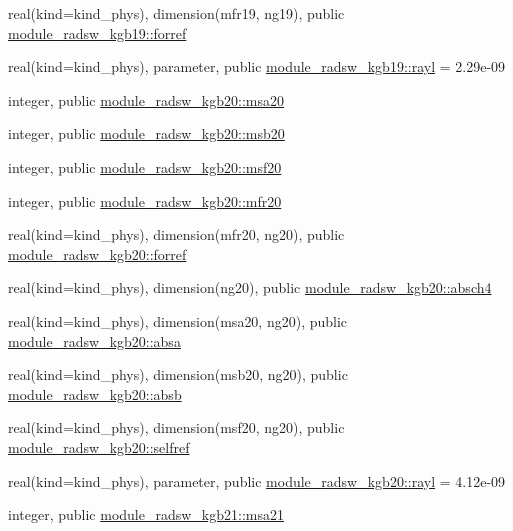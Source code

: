 \begin{DoxyCompactItemize}
\item 
real(kind=kind\+\_\+phys), dimension(mfr19, ng19), public \hyperlink{group__module__radsw__main_gabb4c30ad8e82694b33df78bb2687df6d}{module\+\_\+radsw\+\_\+kgb19\+::forref}
\item 
real(kind=kind\+\_\+phys), parameter, public \hyperlink{group__module__radsw__main_gac79ad61e8d246d6075664df4201373d7}{module\+\_\+radsw\+\_\+kgb19\+::rayl} = 2.\+29e-\/09
\item 
integer, public \hyperlink{namespacemodule__radsw__kgb20_aadf199a3d453192a891b575d9adf8608}{module\+\_\+radsw\+\_\+kgb20\+::msa20}
\item 
integer, public \hyperlink{group__module__radsw__main_ga385f5b8c61ed1de7aa3bbb6bd65f522f}{module\+\_\+radsw\+\_\+kgb20\+::msb20}
\item 
integer, public \hyperlink{group__module__radsw__main_ga925dc2da02eef4edcf000a14525a7c7e}{module\+\_\+radsw\+\_\+kgb20\+::msf20}
\item 
integer, public \hyperlink{group__module__radsw__main_ga9c7964eeb3acb4a11757fce977b73022}{module\+\_\+radsw\+\_\+kgb20\+::mfr20}
\item 
real(kind=kind\+\_\+phys), dimension(mfr20, ng20), public \hyperlink{group__module__radsw__main_ga3a660a7564064ca9997af9f95a5293b9}{module\+\_\+radsw\+\_\+kgb20\+::forref}
\item 
real(kind=kind\+\_\+phys), dimension(ng20), public \hyperlink{group__module__radsw__main_ga1757aee0ec8211f84e2c9334cc9b0f9d}{module\+\_\+radsw\+\_\+kgb20\+::absch4}
\item 
real(kind=kind\+\_\+phys), dimension(msa20, ng20), public \hyperlink{group__module__radsw__main_ga405eabf194b1216dd083c2344e80f5b4}{module\+\_\+radsw\+\_\+kgb20\+::absa}
\item 
real(kind=kind\+\_\+phys), dimension(msb20, ng20), public \hyperlink{group__module__radsw__main_gaf5b135f82f34831e86a12f726cbe47ad}{module\+\_\+radsw\+\_\+kgb20\+::absb}
\item 
real(kind=kind\+\_\+phys), dimension(msf20, ng20), public \hyperlink{group__module__radsw__main_gaa3853af5e29277f9ed2bdd397cab5029}{module\+\_\+radsw\+\_\+kgb20\+::selfref}
\item 
real(kind=kind\+\_\+phys), parameter, public \hyperlink{group__module__radsw__main_ga6a00db6ce81c299d44ef5eadc1fe3b5b}{module\+\_\+radsw\+\_\+kgb20\+::rayl} = 4.\+12e-\/09
\item 
integer, public \hyperlink{namespacemodule__radsw__kgb21_a235b17e9b4b37668028c572f80e1188a}{module\+\_\+radsw\+\_\+kgb21\+::msa21}

\end{DoxyCompactItemize}
